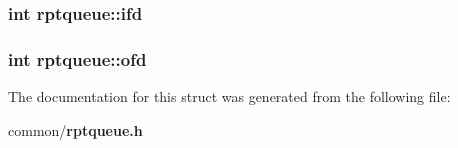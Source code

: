 \subsubsection{\setlength{\rightskip}{0pt plus 5cm}int \bf{rptqueue::ifd}}\label{structrptqueue_30cb2c39efbf85bc88ec7467ba9854df}


\subsubsection{\setlength{\rightskip}{0pt plus 5cm}int \bf{rptqueue::ofd}}\label{structrptqueue_3b50b50f0ca2115f860b020b83c09936}




The documentation for this struct was generated from the following file:\begin{CompactItemize}
\item 
common/\bf{rptqueue.h}\end{CompactItemize}
